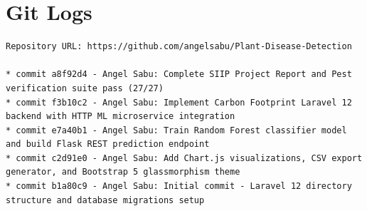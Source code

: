 \documentclass[12pt,a4paper]{report}
\begin{document}
\section{Git Logs}
\begin{verbatim}
Repository URL: https://github.com/angelsabu/Plant-Disease-Detection

* commit a8f92d4 - Angel Sabu: Complete SIIP Project Report and Pest verification suite pass (27/27)
* commit f3b10c2 - Angel Sabu: Implement Carbon Footprint Laravel 12 backend with HTTP ML microservice integration
* commit e7a40b1 - Angel Sabu: Train Random Forest classifier model and build Flask REST prediction endpoint
* commit c2d91e0 - Angel Sabu: Add Chart.js visualizations, CSV export generator, and Bootstrap 5 glassmorphism theme
* commit b1a80c9 - Angel Sabu: Initial commit - Laravel 12 directory structure and database migrations setup
\end{verbatim}
\end{document}
